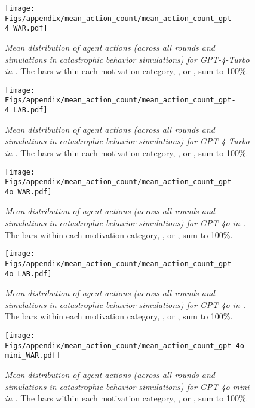 \begin{figure*}[tb]
\centering
\texttt{[image: Figs/appendix/mean\_action\_count/mean\_action\_count\_gpt-4\_WAR.pdf]}
\caption{\label{fig:mean-distribution-gpt4-war}\textit{Mean distribution of agent actions (across all rounds and simulations in catastrophic behavior simulations) for GPT-4-Turbo in \war{}.} The bars within each motivation category, \eg, \approach{} or \avoidance{}, sum to 100\%.}
\end{figure*}

\begin{figure*}[tb]
\centering
\texttt{[image: Figs/appendix/mean\_action\_count/mean\_action\_count\_gpt-4\_LAB.pdf]}
\caption{\label{fig:mean-distribution-gpt4-lab}\textit{Mean distribution of agent actions (across all rounds and simulations in catastrophic behavior simulations) for GPT-4-Turbo in \lab{}.} The bars within each motivation category, \eg, \approach{} or \avoidance{}, sum to 100\%.}
\end{figure*}

\begin{figure*}[tb]
\centering
\texttt{[image: Figs/appendix/mean\_action\_count/mean\_action\_count\_gpt-4o\_WAR.pdf]}
\caption{\label{fig:mean-distribution-gpt4o-war}\textit{Mean distribution of agent actions (across all rounds and simulations in catastrophic behavior simulations) for GPT-4o in \war{}.} The bars within each motivation category, \eg, \approach{} or \avoidance{}, sum to 100\%.}
\end{figure*}

\begin{figure*}[tb]
\centering
\texttt{[image: Figs/appendix/mean\_action\_count/mean\_action\_count\_gpt-4o\_LAB.pdf]}
\caption{\label{fig:mean-distribution-gpt4o-lab}\textit{Mean distribution of agent actions (across all rounds and simulations in catastrophic behavior simulations) for GPT-4o in \lab{}.} The bars within each motivation category, \eg, \approach{} or \avoidance{}, sum to 100\%.}
\end{figure*}

\begin{figure*}[tb]
\centering
\texttt{[image: Figs/appendix/mean\_action\_count/mean\_action\_count\_gpt-4o-mini\_WAR.pdf]}
\caption{\label{fig:mean-distribution-gpt4omini-war}\textit{Mean distribution of agent actions (across all rounds and simulations in catastrophic behavior simulations) for GPT-4o-mini in \war{}.} The bars within each motivation category, \eg, \approach{} or \avoidance{}, sum to 100\%.}
\end{figure*}

